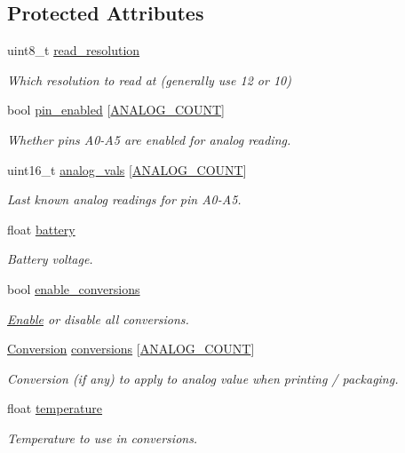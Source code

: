 \subsection*{Protected Attributes}
\begin{DoxyCompactItemize}
\item 
uint8\+\_\+t \hyperlink{class_loom___analog_a8593018496b601b75eec9a1df44574fb}{read\+\_\+resolution}
\begin{DoxyCompactList}\small\item\em Which resolution to read at (generally use 12 or 10) \end{DoxyCompactList}\item 
bool \hyperlink{class_loom___analog_a1111168ede4b93a1507e0cd67d849fd7}{pin\+\_\+enabled} \mbox{[}\hyperlink{_analog_8h_a33ca45f6b669c25166a400e7b21999a2}{A\+N\+A\+L\+O\+G\+\_\+\+C\+O\+U\+NT}\mbox{]}
\begin{DoxyCompactList}\small\item\em Whether pins A0-\/\+A5 are enabled for analog reading. \end{DoxyCompactList}\item 
uint16\+\_\+t \hyperlink{class_loom___analog_a9badecf02377889b100678c8c50ba387}{analog\+\_\+vals} \mbox{[}\hyperlink{_analog_8h_a33ca45f6b669c25166a400e7b21999a2}{A\+N\+A\+L\+O\+G\+\_\+\+C\+O\+U\+NT}\mbox{]}
\begin{DoxyCompactList}\small\item\em Last known analog readings for pin A0-\/\+A5. \end{DoxyCompactList}\item 
float \hyperlink{class_loom___analog_a1a1f859c11385e20ff2328f7df868436}{battery}
\begin{DoxyCompactList}\small\item\em Battery voltage. \end{DoxyCompactList}\item 
bool \hyperlink{class_loom___analog_ab1be771ab1dfad8ddb955c42ba3a3de6}{enable\+\_\+conversions}
\begin{DoxyCompactList}\small\item\em \hyperlink{namespace_enable}{Enable} or disable all conversions. \end{DoxyCompactList}\item 
\hyperlink{class_loom___analog_a83079adfd115a272351323429cefad46}{Conversion} \hyperlink{class_loom___analog_a3bf07770f1244670cbfaa8d6e563f2ef}{conversions} \mbox{[}\hyperlink{_analog_8h_a33ca45f6b669c25166a400e7b21999a2}{A\+N\+A\+L\+O\+G\+\_\+\+C\+O\+U\+NT}\mbox{]}
\begin{DoxyCompactList}\small\item\em Conversion (if any) to apply to analog value when printing / packaging. \end{DoxyCompactList}\item 
float \hyperlink{class_loom___analog_ad01ead292b5fecf5178cd1baf9354ac3}{temperature}
\begin{DoxyCompactList}\small\item\em Temperature to use in conversions. \end{DoxyCompactList}\end{DoxyCompactItemize}
